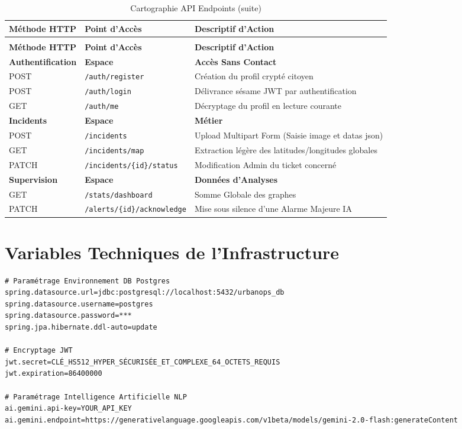 \documentclass[12pt,a4paper,oneside]{book} %
\begin{document}
\begin{longtable}{@{}l l >{\RaggedRight\arraybackslash}p{7cm}@{}}
  \caption{Cartographie API Endpoints} \label{tab:cartographie-api} \\
  \toprule
  \textbf{Méthode HTTP} & \textbf{Point d'Accès} & \textbf{Descriptif d'Action} \\
  \midrule
  \endfirsthead
  \caption[]{Cartographie API Endpoints (suite)} \\
  \toprule
  \textbf{Méthode HTTP} & \textbf{Point d'Accès} & \textbf{Descriptif d'Action} \\
  \midrule
  \endhead
  \rowcolor{LightBand}
  \textbf{Authentification} & \textbf{Espace} & \textbf{Accès Sans Contact} \\
  POST & \texttt{/auth/register} & Création du profil crypté citoyen \\
  POST & \texttt{/auth/login} & Délivrance sésame JWT par authentification \\
  GET & \texttt{/auth/me} & Décryptage du profil en lecture courante \\
  \midrule
  \rowcolor{LightBand}
  \textbf{Incidents} & \textbf{Espace} & \textbf{Métier} \\
  POST & \texttt{/incidents} & Upload Multipart Form (Saisie image et datas json) \\
  GET & \texttt{/incidents/map} & Extraction légère des latitudes/longitudes globales \\
  PATCH & \texttt{/incidents/\{id\}/status} & Modification Admin du ticket concerné \\
  \midrule
  \rowcolor{LightBand}
  \textbf{Supervision} & \textbf{Espace} & \textbf{Données d'Analyses} \\
  GET & \texttt{/stats/dashboard} & Somme Globale des graphes \\
  PATCH & \texttt{/alerts/\{id\}/acknowledge} & Mise sous silence d'une Alarme Majeure IA \\
  \bottomrule
\end{longtable}

\chapter{Variables Techniques de l'Infrastructure}

\begin{lstlisting}[caption={Extrait Standard properties (.env local)},label=lst:config]
# Paramétrage Environnement DB Postgres
spring.datasource.url=jdbc:postgresql://localhost:5432/urbanops_db
spring.datasource.username=postgres
spring.datasource.password=***
spring.jpa.hibernate.ddl-auto=update

# Encryptage JWT
jwt.secret=CLÉ_HS512_HYPER_SÉCURISÉE_ET_COMPLEXE_64_OCTETS_REQUIS
jwt.expiration=86400000

# Paramétrage Intelligence Artificielle NLP
ai.gemini.api-key=YOUR_API_KEY
ai.gemini.endpoint=https://generativelanguage.googleapis.com/v1beta/models/gemini-2.0-flash:generateContent
\end{lstlisting}
\end{document}
